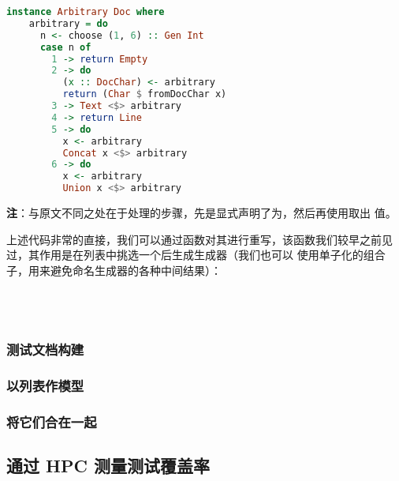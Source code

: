 \documentclass[./main.tex]{subfiles}
\begin{document}
\begin{lstlisting}[language=Haskell]
  instance Arbitrary Doc where
    arbitrary = do
      n <- choose (1, 6) :: Gen Int
      case n of
        1 -> return Empty
        2 -> do
          (x :: DocChar) <- arbitrary
          return (Char $ fromDocChar x)
        3 -> Text <$> arbitrary
        4 -> return Line
        5 -> do
          x <- arbitrary
          Concat x <$> arbitrary
        6 -> do
          x <- arbitrary
          Union x <$> arbitrary
\end{lstlisting}

\textbf{注}：与原文不同之处在于处理的步骤，先是显式声明了为，然后再使用取出
值。

上述代码非常的直接，我们可以通过函数对其进行重写，该函数我们较早之前见过，其作用是在列表中挑选一个后生成生成器（我们也可以
使用单子化的组合子，用来避免命名生成器的各种中间结果）：

\begin{lstlisting}[language=Haskell]

\end{lstlisting}



\begin{lstlisting}[language=Haskell]

\end{lstlisting}



\begin{lstlisting}[language=Haskell]

\end{lstlisting}



\begin{lstlisting}[language=Haskell]

\end{lstlisting}

\subsubsection*{测试文档构建}

\subsubsection*{以列表作模型}

\subsubsection*{将它们合在一起}

\subsection*{通过 HPC 测量测试覆盖率}
\end{document}
